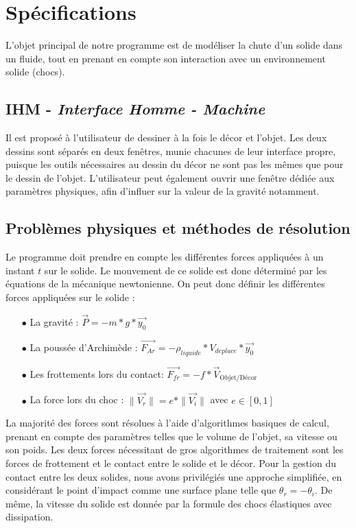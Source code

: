\section{Spécifications}
L'objet principal de notre programme est de modéliser la chute d'un solide dans un
fluide, tout en prenant en compte son interaction avec un environnement solide (chocs).

\subsection{IHM - \emph{Interface Homme - Machine}}
Il est proposé à l'utilisateur de dessiner à la fois le décor et l'objet.
Les deux dessins sont séparés en deux fenêtres, munie chacunes de leur interface propre,
puisque les outils nécessaires au dessin du décor ne sont pas les mêmes que pour le dessin de l'objet.
L'utilisateur peut également ouvrir une fenêtre dédiée aux paramètres physiques, afin d'influer
sur la valeur de la gravité notamment.

\subsection{Problèmes physiques et méthodes de résolution}
Le programme doit prendre en compte les différentes forces appliquées à 
un instant $t$ sur le solide. Le mouvement de ce solide est donc déterminé
par les équations de la mécanique newtonienne.
On peut donc définir les différentes forces appliquées sur le solide :

\begin{itemize}
\item[$\bullet$] La gravité : \dotfill{} $\overrightarrow{P} = -m*g*\overrightarrow{y_0}$ 
\item[$\bullet$] La poussée d'Archimède : \dotfill{} $\overrightarrow{F_{Ar}} = -\rho_{liquide} * V_{deplace} *\overrightarrow{y_0} $
\item[$\bullet$] Les frottements lors du contact: \dotfill{}$\overrightarrow{F_{fr}} = -f*\overrightarrow{V}_{\text{Objet/Décor}}$
\item[$\bullet$] La force lors du choc : \dotfill{} $ \|\overrightarrow{V_r} \|= e * \| \overrightarrow{V_i} \|$ avec $ e \in [ 0 , 1 ] $\\
\end{itemize}

La majorité des forces sont résolues à l'aide d'algorithmes basiques de
calcul, prenant en compte des paramètres telles que le volume de l'objet,
sa vitesse ou son poids. Les deux forces nécessitant de gros algorithmes
de traitement sont les forces de frottement et le contact entre le solide
et le décor.
Pour la gestion du contact entre les deux solides, nous avons privilégiés
une approche simplifiée, en considérant le point d'impact comme une surface
 plane telle que $\theta_r = -\theta_i$. De même, la vitesse du solide est donnée
par la formule des chocs élastiques avec dissipation.
\newpage

